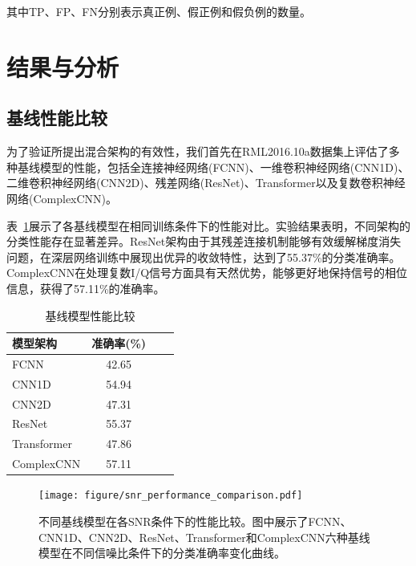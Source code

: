 \documentclass[conference]{IEEEtran}
\begin{document}
其中TP、FP、FN分别表示真正例、假正例和假负例的数量。


\section{结果与分析}

\subsection{基线性能比较}

为了验证所提出混合架构的有效性，我们首先在RML2016.10a数据集上评估了多种基线模型的性能，包括全连接神经网络(FCNN)、一维卷积神经网络(CNN1D)、二维卷积神经网络(CNN2D)、残差网络(ResNet)、Transformer以及复数卷积神经网络(ComplexCNN)。

表~\ref{tab:baseline_comparison}展示了各基线模型在相同训练条件下的性能对比。实验结果表明，不同架构的分类性能存在显著差异。ResNet架构由于其残差连接机制能够有效缓解梯度消失问题，在深层网络训练中展现出优异的收敛特性，达到了55.37\%的分类准确率。ComplexCNN在处理复数I/Q信号方面具有天然优势，能够更好地保持信号的相位信息，获得了57.11\%的准确率。

\begin{table}[h]
\centering
\caption{基线模型性能比较}
\label{tab:baseline_comparison}
\begin{tabular}{@{}lccc@{}}
\toprule
模型架构 & 准确率(\%) \\
\midrule
FCNN & 42.65 \\
CNN1D & 54.94 \\
CNN2D & 47.31 \\
ResNet & 55.37 \\
Transformer & 47.86 \\
ComplexCNN & 57.11 \\
\bottomrule
\end{tabular}
\end{table}

\begin{figure}[htbp]
\centering
\texttt{[image: figure/snr\_performance\_comparison.pdf]}
\caption{不同基线模型在各SNR条件下的性能比较。图中展示了FCNN、CNN1D、CNN2D、ResNet、Transformer和ComplexCNN六种基线模型在不同信噪比条件下的分类准确率变化曲线。}
\label{fig:snr_performance}
\end{figure}

\end{document}
